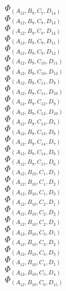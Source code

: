 \documentclass[14pt]{article}
\begin{document}
    $\Phi_{({A}_{12}, {B}_{9}, {C}_{7}, {D}_{14})}$ \\ 
    $\Phi_{({A}_{12}, {B}_{9}, {C}_{8}, {D}_{13})}$ \\ 
    $\Phi_{({A}_{12}, {B}_{9}, {C}_{8}, {D}_{14})}$ \\ 
    $\Phi_{({A}_{12}, {B}_{9}, {C}_{9}, {D}_{11})}$ \\ 
    $\Phi_{({A}_{12}, {B}_{9}, {C}_{9}, {D}_{12})}$ \\ 
    $\Phi_{({A}_{12}, {B}_{9}, {C}_{10}, {D}_{11})}$ \\ 
    $\Phi_{({A}_{12}, {B}_{9}, {C}_{10}, {D}_{12})}$ \\ 
    $\Phi_{({A}_{12}, {B}_{9}, {C}_{11}, {D}_{9})}$ \\ 
    $\Phi_{({A}_{12}, {B}_{9}, {C}_{11}, {D}_{10})}$ \\ 
    $\Phi_{({A}_{12}, {B}_{9}, {C}_{12}, {D}_{9})}$ \\ 
    $\Phi_{({A}_{12}, {B}_{9}, {C}_{12}, {D}_{10})}$ \\ 
    $\Phi_{({A}_{12}, {B}_{9}, {C}_{13}, {D}_{7})}$ \\ 
    $\Phi_{({A}_{12}, {B}_{9}, {C}_{13}, {D}_{8})}$ \\ 
    $\Phi_{({A}_{12}, {B}_{9}, {C}_{14}, {D}_{7})}$ \\ 
    $\Phi_{({A}_{12}, {B}_{9}, {C}_{14}, {D}_{8})}$ \\ 
    $\Phi_{({A}_{12}, {B}_{9}, {C}_{15}, {D}_{6})}$ \\ 
    $\Phi_{({A}_{12}, {B}_{10}, {C}_{1}, {D}_{1})}$ \\ 
    $\Phi_{({A}_{12}, {B}_{10}, {C}_{1}, {D}_{2})}$ \\ 
    $\Phi_{({A}_{12}, {B}_{10}, {C}_{1}, {D}_{3})}$ \\ 
    $\Phi_{({A}_{12}, {B}_{10}, {C}_{2}, {D}_{1})}$ \\ 
    $\Phi_{({A}_{12}, {B}_{10}, {C}_{2}, {D}_{2})}$ \\ 
    $\Phi_{({A}_{12}, {B}_{10}, {C}_{2}, {D}_{3})}$ \\ 
    $\Phi_{({A}_{12}, {B}_{10}, {C}_{3}, {D}_{1})}$ \\ 
    $\Phi_{({A}_{12}, {B}_{10}, {C}_{3}, {D}_{2})}$ \\ 
    $\Phi_{({A}_{12}, {B}_{10}, {C}_{3}, {D}_{3})}$ \\ 
    $\Phi_{({A}_{12}, {B}_{10}, {C}_{4}, {D}_{5})}$ \\ 
    $\Phi_{({A}_{12}, {B}_{10}, {C}_{5}, {D}_{4})}$ \\ 
    $\Phi_{({A}_{12}, {B}_{10}, {C}_{6}, {D}_{15})}$ \\ 
\end{document}
